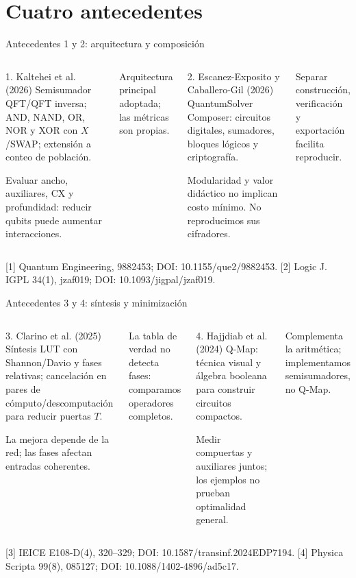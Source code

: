 \documentclass[aspectratio=169,12pt]{beamer}
\newcommand{\fuente}[1]{\vfill{\color{gris}\tiny #1\par}}
\begin{document}
\section{Cuatro antecedentes}
\begin{frame}{Antecedentes 1 y 2: arquitectura y composición}

\begin{columns}[T,onlytextwidth]
\begin{block}{1. Kaltehei et al. (2026)}
Semisumador QFT/QFT inversa; AND, NAND, OR, NOR y XOR con $X$/SWAP; extensión a conteo de población.
\smallskip\par
Evaluar ancho, auxiliares, CX y profundidad: reducir qubits puede aumentar interacciones.
\end{block}
Arquitectura principal adoptada; las métricas son propias.
\begin{block}{2. Escanez-Exposito y Caballero-Gil (2026)}
QuantumSolver Composer: circuitos digitales, sumadores, bloques lógicos y criptografía.
\smallskip\par
Modularidad y valor didáctico no implican costo mínimo. No reproducimos sus cifradores.
\end{block}
Separar construcción, verificación y exportación facilita reproducir.
\end{columns}
\fuente{[1] Quantum Engineering, 9882453; DOI: 10.1155/que2/9882453. [2] Logic J. IGPL 34(1), jzaf019; DOI: 10.1093/jigpal/jzaf019.}
\end{frame}



\begin{frame}{Antecedentes 3 y 4: síntesis y minimización}

\begin{columns}[T,onlytextwidth]
\begin{block}{3. Clarino et al. (2025)}
Síntesis LUT con Shannon/Davio y fases relativas; cancelación en pares de cómputo/descomputación para reducir puertas $T$.
\smallskip\par
La mejora depende de la red; las fases afectan entradas coherentes.
\end{block}
La tabla de verdad no detecta fases: comparamos operadores completos.
\begin{block}{4. Hajjdiab et al. (2024)}
Q-Map: técnica visual y álgebra booleana para construir circuitos compactos.
\smallskip\par
Medir compuertas y auxiliares juntos; los ejemplos no prueban optimalidad general.
\end{block}
Complementa la aritmética; implementamos semisumadores, no Q-Map.
\end{columns}
\fuente{[3] IEICE E108-D(4), 320--329; DOI: 10.1587/transinf.2024EDP7194. [4] Physica Scripta 99(8), 085127; DOI: 10.1088/1402-4896/ad5c17.}
\end{frame}
\end{document}
